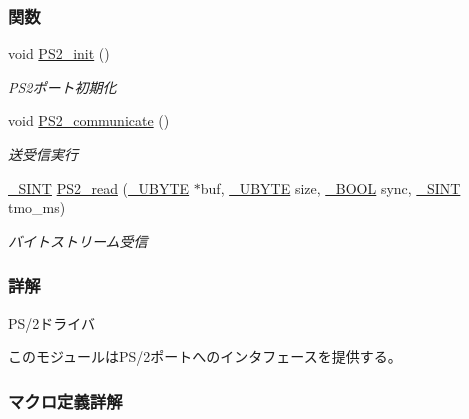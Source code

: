\subsubsection*{関数}
\begin{DoxyCompactItemize}
\item 
void \hyperlink{ps2_8h_ab0b647dfe8288c9dc8979e39d857da2e_ab0b647dfe8288c9dc8979e39d857da2e}{P\+S2\+\_\+init} ()
\begin{DoxyCompactList}\small\item\em P\+S2ポート初期化 \end{DoxyCompactList}\item 
void \hyperlink{ps2_8h_a357c99ffcca784faa4315630ba109c26_a357c99ffcca784faa4315630ba109c26}{P\+S2\+\_\+communicate} ()
\begin{DoxyCompactList}\small\item\em 送受信実行 \end{DoxyCompactList}\item 
\hyperlink{stddef_8h_aefd1068e35d26c0e7d7079ddf2579174_aefd1068e35d26c0e7d7079ddf2579174}{\+\_\+\+S\+I\+N\+T} \hyperlink{ps2_8h_aeb03cb5d2199008f8b0cf6793300bdab_aeb03cb5d2199008f8b0cf6793300bdab}{P\+S2\+\_\+read} (\hyperlink{stddef_8h_aac464b47452ce9406f88ef194e2becc1_aac464b47452ce9406f88ef194e2becc1}{\+\_\+\+U\+B\+Y\+T\+E} $\ast$buf, \hyperlink{stddef_8h_aac464b47452ce9406f88ef194e2becc1_aac464b47452ce9406f88ef194e2becc1}{\+\_\+\+U\+B\+Y\+T\+E} size, \hyperlink{stddef_8h_afbf708854fe02af8475a9ba02f3196cb_afbf708854fe02af8475a9ba02f3196cb}{\+\_\+\+B\+O\+O\+L} sync, \hyperlink{stddef_8h_aefd1068e35d26c0e7d7079ddf2579174_aefd1068e35d26c0e7d7079ddf2579174}{\+\_\+\+S\+I\+N\+T} tmo\+\_\+ms)
\begin{DoxyCompactList}\small\item\em バイトストリーム受信 \end{DoxyCompactList}\end{DoxyCompactItemize}


\subsubsection{詳解}
P\+S/2ドライバ 

このモジュールは\+P\+S/2ポートへのインタフェースを提供する。

 

\subsubsection{マクロ定義詳解}
